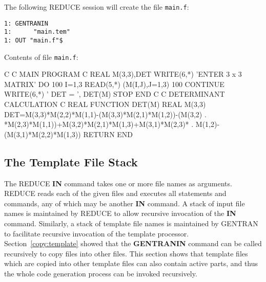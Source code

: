The following REDUCE session will create the file {\tt main.f}:
\begin{verbatim}
1: GENTRANIN 
1:      "main.tem" 
1: OUT "main.f"$
\end{verbatim}

Contents of file {\tt main.f}:
\begin{framedverbatim}
C                                                         
C  MAIN PROGRAM                                           
C                                                         
      REAL M(3,3),DET                                   
      WRITE(6,*) 'ENTER 3 x 3 MATRIX'                     
      DO 100 I=1,3                                        
          READ(5,*) (M(I,J),J=1,3)                        
100   CONTINUE                                            
      WRITE(6,*) ' DET = ', DET(M)                        
      STOP                                                
      END                                                 
C                                                         
C  DETERMINANT CALCULATION                                
C                                                         
      REAL FUNCTION DET(M)                              
      REAL M(3,3)                                       
      DET=M(3,3)*M(2,2)*M(1,1)-(M(3,3)*M(2,1)*M(1,2))-(M(3,2)
     . *M(2,3)*M(1,1))+M(3,2)*M(2,1)*M(1,3)+M(3,1)*M(2,3)*
     . M(1,2)-(M(3,1)*M(2,2)*M(1,3))
      RETURN                                              
      END                                                 
\end{framedverbatim} 

\subsection{The Template File Stack}
\label{template:stack}

The REDUCE {\bf IN} command takes one or more file names as
arguments.  REDUCE reads each of the given files and executes all
statements and commands, any of which may be another {\bf IN}
command.  A stack of input file names is maintained by
REDUCE to allow recursive invocation of the {\bf IN} command.  Similarly,
a stack of template file names is maintained by GENTRAN to facilitate
recursive invocation of the template processor.  Section~\ref{copy:template}
showed that the {\bf GENTRANIN} command can be
called recursively to copy files into other files.  This section shows
that template files which are copied into other template files can also
contain active parts, and thus the whole code generation process can
be invoked recursively.

